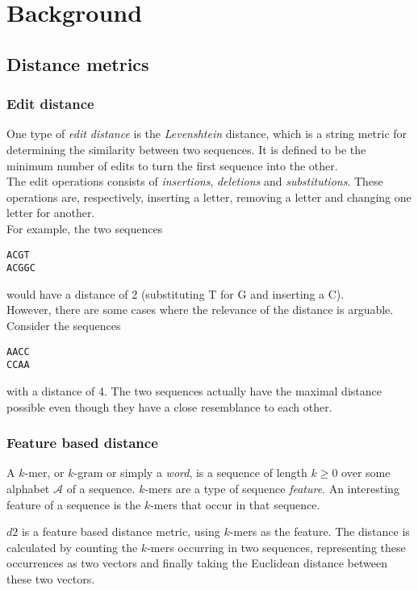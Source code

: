 \section{Background}

\subsection{Distance metrics}

\subsubsection{Edit distance}
One type of \emph{edit distance} is the \emph{Levenshtein} distance, which is a
string metric for determining the similarity between two sequences. It is
defined to be the minimum number of edits to turn the first sequence into the
other. \\
The edit operations consists of \emph{insertions}, \emph{deletions} and
\emph{substitutions}. These operations are, respectively, inserting a letter,
removing a letter and changing one letter for another. \\
For example, the two sequences
\begin{center}
\texttt{ACGT} \\
\texttt{ACGGC}
\end{center}
would have a distance of 2 (substituting T for G and inserting a C). \\
However, there are some cases where the relevance of the distance is arguable.
Consider the sequences
\begin{center}
\texttt{AACC} \\
\texttt{CCAA}
\end{center}
with a distance of 4. The two sequences actually have the maximal distance
possible even though they have a close resemblance to each other.


\subsubsection{Feature based distance}
A $k$-mer, or $k$-gram or simply a \emph{word}, is a sequence of length
$k \geq 0$ over some alphabet $\mathcal{A}$ of a sequence. $k$-mers are a type
of sequence \emph{feature}. An interesting feature of a sequence is the
$k$-mers that occur in that sequence.

$d2$ is a feature based distance metric, using $k$-mers as the feature. The
distance is calculated by counting the $k$-mers occurring in two sequences,
representing these occurrences as two vectors and finally taking the Euclidean
distance between these two vectors.

